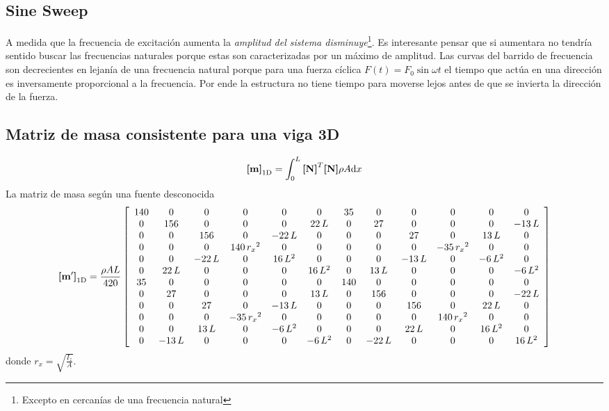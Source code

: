 \subsection*{Sine Sweep}
A medida que la frecuencia de excitación aumenta la \textit{amplitud del sistema disminuye}\footnote{Excepto en cercanías de una frecuencia natural}. Es interesante pensar que si aumentara no tendría sentido buscar las frecuencias naturales porque estas son caracterizadas por un máximo de amplitud. Las curvas del barrido de frecuencia son decrecientes en lejanía de una frecuencia natural porque para una fuerza cíclica $F(t)=F_0\sin \omega t$ el tiempo que actúa en una dirección es inversamente proporcional a la frecuencia. Por ende la estructura no tiene tiempo para moverse lejos antes de que se invierta la dirección de la fuerza.

\subsection*{Matriz de masa consistente para una viga 3D}
  \begin{equation}
  	\boldsymbol{[}\mathbf{m} \boldsymbol{]}_{\mathrm{1D}} = \int_0^L \boldsymbol{[}\mathbf{N} \boldsymbol{]}^T \boldsymbol{[}\mathbf{N} \boldsymbol{]} \rho A \textrm{d} x
  \end{equation}
  La matriz de masa según una fuente desconocida
  \begin{equation}
  	\boldsymbol{[}\mathbf{m'} \boldsymbol{]}_{\mathrm{1D}}= \frac{\rho A L}{420}\left[\begin{array}{cccccccccccc} 140 & 0 & 0 & 0 & 0 & 0 & 35 & 0 & 0 & 0 & 0 & 0\\ 0 & 156 & 0 & 0 & 0 & 22\,L & 0 & 27 & 0 & 0 & 0 & -13\,L\\ 0 & 0 & 156 & 0 & -22\,L & 0 & 0 & 0 & 27 & 0 & 13\,L & 0\\ 0 & 0 & 0 & 140\,{r_{x}}^2 & 0 & 0 & 0 & 0 & 0 & -35\,{r_{x}}^2 & 0 & 0\\ 0 & 0 & -22\,L & 0 & 16\,L^2 & 0 & 0 & 0 & -13\,L & 0 & -6\,L^2 & 0\\ 0 & 22\,L & 0 & 0 & 0 & 16\,L^2 & 0 & 13\,L & 0 & 0 & 0 & -6\,L^2\\ 35 & 0 & 0 & 0 & 0 & 0 & 140 & 0 & 0 & 0 & 0 & 0\\ 0 & 27 & 0 & 0 & 0 & 13\,L & 0 & 156 & 0 & 0 & 0 & -22\,L\\ 0 & 0 & 27 & 0 & -13\,L & 0 & 0 & 0 & 156 & 0 & 22\,L & 0\\ 0 & 0 & 0 & -35\,{r_{x}}^2 & 0 & 0 & 0 & 0 & 0 & 140\,{r_{x}}^2 & 0 & 0\\ 0 & 0 & 13\,L & 0 & -6\,L^2 & 0 & 0 & 0 & 22\,L & 0 & 16\,L^2 & 0\\ 0 & -13\,L & 0 & 0 & 0 & -6\,L^2 & 0 & -22\,L & 0 & 0 & 0 & 16\,L^2 \end{array}\right]	
  \end{equation}
donde $r_x =\sqrt{ \frac{I_z}{A}}$. 


